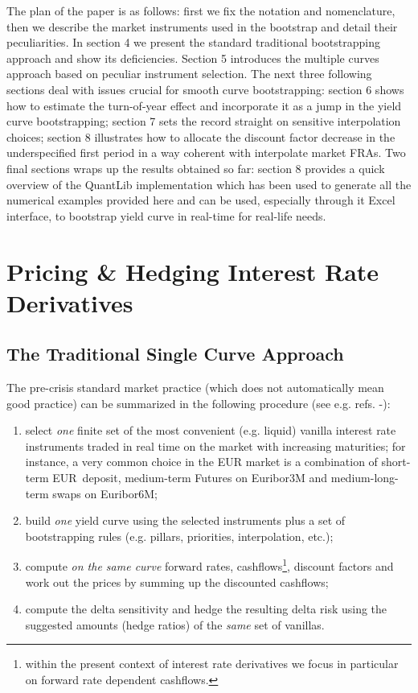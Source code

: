 \documentclass[11pt,reqno]{amsart}
\begin{document}
The plan of the paper is as follows: first we fix the notation and nomenclature, then we describe the market instruments used in the bootstrap and detail their peculiarities. In section 4 we present the standard traditional bootstrapping approach and show its deficiencies. Section 5 introduces the multiple curves approach based on peculiar instrument selection. The next three following sections deal with issues crucial for smooth curve bootstrapping: section 6 shows how to estimate the turn-of-year effect and incorporate it as a jump in the yield curve bootstrapping; section 7 sets the record straight on sensitive interpolation choices; section 8 illustrates how to allocate the discount factor decrease in the underspecified first period in a way coherent with interpolate market FRAs. Two final sections wraps up the results obtained so far: section 8 provides a quick overview of the QuantLib implementation which has been used to generate all the numerical examples provided here and can be used, especially through it Excel interface, to bootstrap yield curve in real-time for real-life needs.


\section{\label{SecPricing}Pricing \& Hedging Interest Rate Derivatives}

\subsection{\label{SecSingleCurve}The Traditional Single Curve Approach}
The pre-crisis standard market practice (which does not automatically mean good practice) can be summarized in the following procedure (see e.g. refs. \cite{HaganWest2008}-\cite{Ron2000}):

\begin{enumerate}
\item select \textit{one} finite set of the most convenient (e.g. liquid) vanilla interest rate instruments traded in real time on the market with increasing maturities; for instance, a very common choice in the EUR market is a combination of short-term EUR\ deposit, medium-term Futures on Euribor3M and medium-long-term swaps on Euribor6M;

\item build \textit{one} yield curve using the selected instruments plus a set of bootstrapping rules (e.g. pillars, priorities, interpolation, etc.);

\item compute \textit{on the same curve} forward rates, cashflows\footnote{within the present context of interest rate derivatives we focus in particular on forward rate dependent cashflows.}, discount factors and work out the prices by summing up the discounted cashflows;

\item compute the delta sensitivity and hedge the resulting delta risk using the suggested amounts (hedge ratios) of the \textit{same} set of vanillas.
\end{enumerate}
\end{document}
